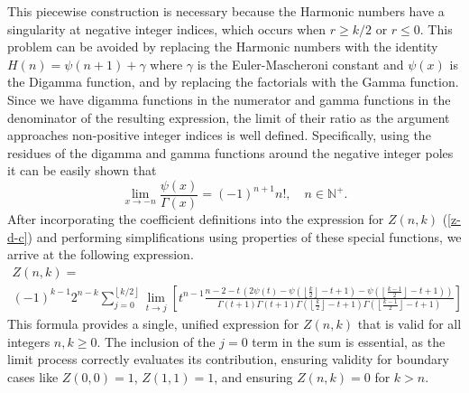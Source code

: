 \documentclass{article}
\newcommand{\floor}[1]{\left\lfloor #1 \right\rfloor}
\begin{document}
This piecewise construction is necessary because the Harmonic numbers have a singularity at negative integer indices, which occurs when $r \geq k/2$ or $r\leq 0$. This problem can be avoided by replacing the Harmonic numbers with the identity $H(n) = \psi(n+1)+\gamma$ where $\gamma$ is the Euler-Mascheroni constant and $\psi(x)$ is the Digamma function, and by replacing the factorials with the Gamma function. Since we have digamma functions in the numerator and gamma functions in the denominator of the resulting expression, the limit of their ratio as the argument approaches non-positive integer indices is well defined. Specifically, using the residues of the digamma and gamma functions around the negative integer poles it can be easily shown that
$$
\lim_{x \to -n}\frac{\psi(x)}{\Gamma(x)} = (-1)^{n+1}n!, \quad n \in\mathbb{N}^{+}.
$$
After incorporating the coefficient definitions into the expression for $Z(n,k)$ (\ref{z-d-c}) and performing simplifications using properties of these special functions, we arrive at the following expression. 
$$
\begin{aligned}
    Z(n,k) =\\
    (-1)^{k-1} 2^{n-k} \sum_{j=0}^{\floor{k/2}} \lim_{t \to j} \left[t^{n-1}
        \frac
            {n-2-t\,\left(2\psi(t)-\psi\left(\floor{\frac{k}{2}}-t+1\right)-\psi\left(\floor{\frac{k-1}{2}}-t+1\right)\right)}
            {\Gamma(t+1) \Gamma(t+1) \Gamma(\floor{\frac{k}{2}}-t+1) \Gamma(\floor{\frac{k-1}{2}}-t+1)}\right]
\end{aligned}
$$
This formula provides a single, unified expression for $Z(n,k)$ that is valid for all integers $n,k \geq 0$. The inclusion of the $j=0$ term in the sum is essential, as the limit process correctly evaluates its contribution, ensuring validity for boundary cases like $Z(0,0)=1$, $ Z(1,1)=1$, and ensuring $Z(n,k)=0$ for $k>n$.
\printbibliography
\end{document}
